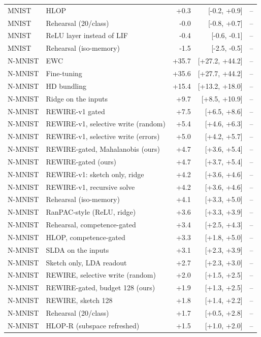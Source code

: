 \begin{tabular}{llrrr}
MNIST & HLOP & +0.3 & [-0.2, +0.9] & -- \\
MNIST & Rehearsal (20/class) & -0.0 & [-0.8, +0.7] & -- \\
MNIST & ReLU layer instead of LIF & -0.4 & [-0.6, -0.1] & -- \\
MNIST & Rehearsal (iso-memory) & -1.5 & [-2.5, -0.5] & -- \\
N-MNIST & EWC & +35.7 & [+27.2, +44.2] & -- \\
N-MNIST & Fine-tuning & +35.6 & [+27.7, +44.2] & -- \\
N-MNIST & HD bundling & +15.4 & [+13.2, +18.0] & -- \\
N-MNIST & Ridge on the inputs & +9.7 & [+8.5, +10.9] & -- \\
N-MNIST & REWIRE-v1 gated & +7.5 & [+6.5, +8.6] & -- \\
N-MNIST & REWIRE-v1, selective write (random) & +5.4 & [+4.6, +6.3] & -- \\
N-MNIST & REWIRE-v1, selective write (errors) & +5.0 & [+4.2, +5.7] & -- \\
N-MNIST & REWIRE-gated, Mahalanobis (ours) & +4.7 & [+3.6, +5.4] & -- \\
N-MNIST & REWIRE-gated (ours) & +4.7 & [+3.7, +5.4] & -- \\
N-MNIST & REWIRE-v1: sketch only, ridge & +4.2 & [+3.6, +4.6] & -- \\
N-MNIST & REWIRE-v1, recursive solve & +4.2 & [+3.6, +4.6] & -- \\
N-MNIST & Rehearsal (iso-memory) & +4.1 & [+3.3, +5.0] & -- \\
N-MNIST & RanPAC-style (ReLU, ridge) & +3.6 & [+3.3, +3.9] & -- \\
N-MNIST & Rehearsal, competence-gated & +3.4 & [+2.5, +4.3] & -- \\
N-MNIST & HLOP, competence-gated & +3.3 & [+1.8, +5.0] & -- \\
N-MNIST & SLDA on the inputs & +3.1 & [+2.3, +3.9] & -- \\
N-MNIST & Sketch only, LDA readout & +2.7 & [+2.3, +3.0] & -- \\
N-MNIST & REWIRE, selective write (random) & +2.0 & [+1.5, +2.5] & -- \\
N-MNIST & REWIRE-gated, budget 128 (ours) & +1.9 & [+1.3, +2.5] & -- \\
N-MNIST & REWIRE, sketch 128 & +1.8 & [+1.4, +2.2] & -- \\
N-MNIST & Rehearsal (20/class) & +1.7 & [+0.5, +2.8] & -- \\
N-MNIST & HLOP-R (subspace refreshed) & +1.5 & [+1.0, +2.0] & -- \\

\end{tabular}
